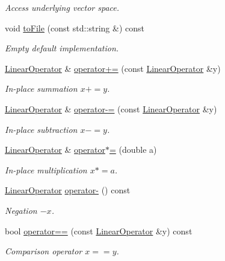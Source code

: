 \begin{DoxyCompactItemize}
\begin{DoxyCompactList}\small\item\em Access underlying vector space. \end{DoxyCompactList}\item 
\hypertarget{classSpacy_1_1VectorBase_a244a3e85ec49dbf2741ca46ea4b711c9}{}void \hyperlink{classSpacy_1_1VectorBase_a244a3e85ec49dbf2741ca46ea4b711c9}{to\+File} (const std\+::string \&) const \label{classSpacy_1_1VectorBase_a244a3e85ec49dbf2741ca46ea4b711c9}

\begin{DoxyCompactList}\small\item\em Empty default implementation. \end{DoxyCompactList}\item 
\hyperlink{classSpacy_1_1FEniCS_1_1LinearOperator}{Linear\+Operator} \& \hyperlink{classSpacy_1_1AddArithmeticOperators_afad1d01e1e8c6f75290ac46d9b047ea8}{operator+=} (const \hyperlink{classSpacy_1_1FEniCS_1_1LinearOperator}{Linear\+Operator} \&y)
\begin{DoxyCompactList}\small\item\em In-\/place summation $ x+=y$. \end{DoxyCompactList}\item 
\hyperlink{classSpacy_1_1FEniCS_1_1LinearOperator}{Linear\+Operator} \& \hyperlink{classSpacy_1_1AddArithmeticOperators_a9fa91e177d13203cfe8cfa991c64ca36}{operator-\/=} (const \hyperlink{classSpacy_1_1FEniCS_1_1LinearOperator}{Linear\+Operator} \&y)
\begin{DoxyCompactList}\small\item\em In-\/place subtraction $ x-=y$. \end{DoxyCompactList}\item 
\hyperlink{classSpacy_1_1FEniCS_1_1LinearOperator}{Linear\+Operator} \& \hyperlink{classSpacy_1_1AddArithmeticOperators_a1d3db95b24fd2bc1de712c9e04c47e2f}{operator$\ast$=} (double a)
\begin{DoxyCompactList}\small\item\em In-\/place multiplication $ x*=a$. \end{DoxyCompactList}\item 
\hyperlink{classSpacy_1_1FEniCS_1_1LinearOperator}{Linear\+Operator} \hyperlink{classSpacy_1_1AddArithmeticOperators_a5acd030bf265d130983fd6e3c5b68be5}{operator-\/} () const
\begin{DoxyCompactList}\small\item\em Negation $ -x$. \end{DoxyCompactList}\item 
bool \hyperlink{classSpacy_1_1AddArithmeticOperators_a5ff1909f49f4a705d69663dc2d4b6316}{operator==} (const \hyperlink{classSpacy_1_1FEniCS_1_1LinearOperator}{Linear\+Operator} \&y) const
\begin{DoxyCompactList}\small\item\em Comparison operator $ x==y$. \end{DoxyCompactList}\end{DoxyCompactItemize}


